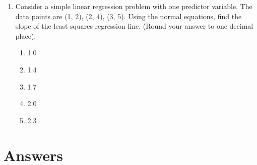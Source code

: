 \documentclass{article}%
\begin{document}
\begin{enumerate}
\item Consider a simple linear regression problem with one predictor variable. The data points are (1, 2), (2, 4), (3, 5). Using the normal equations, find the slope of the least squares regression line. (Round your answer to one decimal place).%
\begin{enumerate}%
\item 1.0%
\item 1.4%
\item 1.7%
\item 2.0%
\item 2.3%
\end{enumerate}%
\vspace{1em}%
\end{enumerate}

%
\newpage%
\section{Answers}%
\label{sec:Answers}%
\end{document}
